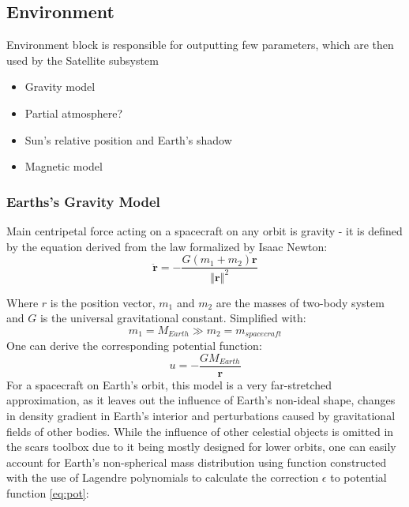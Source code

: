 


    \subsection{Environment}
        Environment block is responsible for outputting few parameters, which are then used by the Satellite subsystem
        \begin{itemize}
            \item Gravity model
            \item Partial atmosphere?
            \item Sun's relative position and Earth's shadow
            \item Magnetic model
        \end{itemize}
        
        \subsubsection{Earths's Gravity Model}
            Main centripetal force acting on a spacecraft on any orbit is gravity - it is defined by the equation derived from the law formalized by Isaac Newton:
            \begin{equation}
                \ddot{\textbf{r}} = -\frac{G(m_1+m_2)\textbf{r}}{\left\Vert \textbf{r} \right\Vert^2}
            \end{equation}

            Where $r$ is the position vector, $m_1$ and $m_2$ are the masses of two-body system and $G$ is the universal gravitational constant. Simplified with:
            \begin{equation}
                m_1 = M_{Earth} \gg m_2 = m_{spacecraft}
            \end{equation}
            One can derive the corresponding potential function:
            \begin{equation}
                u = -\frac{GM_{Earth}}{\textbf{r}}\label{eq:pot}
            \end{equation}
            For a spacecraft on Earth's orbit, this model is a very far-stretched approximation, as it leaves out the influence of Earth's non-ideal shape, changes in density gradient in Earth's interior and perturbations caused by gravitational fields of other bodies. While the influence of other celestial objects is omitted in the \ac{scars} toolbox due to it being mostly designed for lower orbits, one can easily account for Earth's non-spherical mass distribution using function constructed with the use of Lagendre polynomials to calculate the correction $\epsilon$ to potential function \eqref{eq:pot}:

